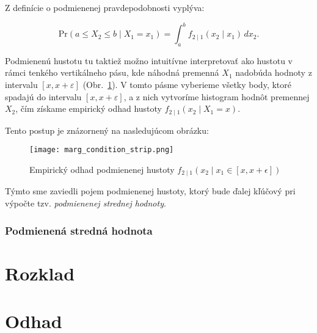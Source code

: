 Z definície o podmienenej pravdepodobnosti vyplýva:

\begin{equation}
\mathrm{Pr}(a \leq X_2 \leq b \mid X_1 = x_1) = \int_a^b f_{2 \mid 1}(x_2 \mid x_1) \, dx_2.
\end{equation}

Podmienenú hustotu tu taktiež možno intuitívne interpretovať ako hustotu v rámci tenkého vertikálneho pásu, kde náhodná premenná $X_1$ nadobúda hodnoty z intervalu $[x, x + \varepsilon]$ (Obr.~\ref{fig:cond_density_strip}). V tomto pásme vyberieme všetky body, ktoré spadajú do intervalu $[x, x + \varepsilon]$, a z nich vytvoríme histogram hodnôt premennej $X_2$, čím získame empirický odhad hustoty $f_{2 \mid 1}(x_2 \mid X_1 = x)$.

Tento postup je znázornený na nasledujúcom obrázku:

\begin{figure}[H]
    \centering
    \texttt{[image: marg\_condition\_strip.png]}
    \caption{Empirický odhad podmienenej hustoty $f_{2 \mid 1}(x_2 \mid x_1 \in [x, x + \epsilon])$}
    \label{fig:cond_density_strip}
\end{figure}

Týmto sme zaviedli pojem podmienenej hustoty, ktorý bude ďalej kľúčový pri výpočte tzv. \textit{podmienenej strednej hodnoty}.

\subsubsection{Podmienená stredná hodnota}\label{subsubsec:conditional_mean}

\section{Rozklad}\label{sec:rozklad_kopule}
\section{Odhad}\label{sec:odhad}